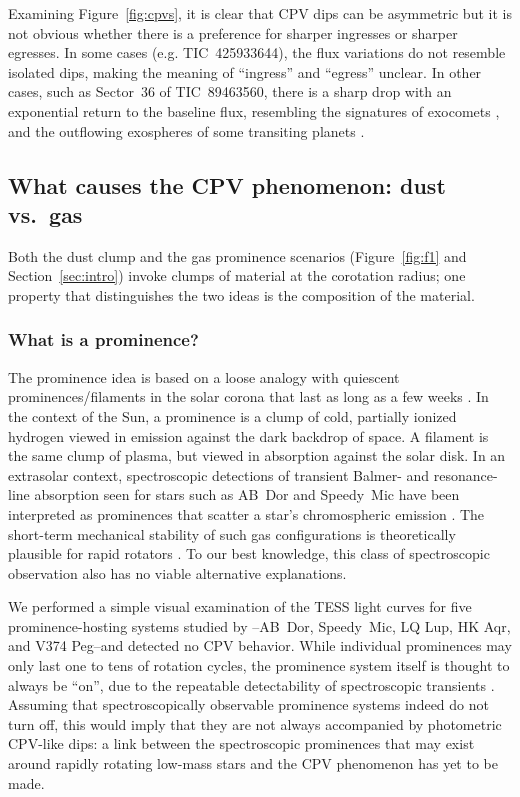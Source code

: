 \documentclass[11pt,twocolumn,tighten,linenumbers]{aastex63}
\begin{document}
Examining Figure~\ref{fig:cpvs}, it is clear that CPV dips can be
asymmetric but it is not obvious whether there is a preference for
sharper ingresses or sharper egresses.  In some cases (e.g.
TIC~425933644), the flux variations do not resemble isolated dips,
making the meaning of ``ingress'' and ``egress'' unclear.  In other
cases, such as Sector~36 of TIC~89463560, there is a sharp drop with
an exponential return to the baseline flux, resembling the signatures
of exocomets \citep[e.g.][]{2018MNRAS.474.1453R,2019A&A...625L..13Z},
and the outflowing exospheres of some transiting planets
\citep[e.g.][]{2019ApJ...873...89M,2022ApJ...926..226M}.


\subsection{What causes the CPV phenomenon: dust vs.\ gas}

Both the dust clump and the gas prominence scenarios
(Figure~\ref{fig:f1} and Section~\ref{sec:intro}) invoke clumps of
material at the corotation radius; one property that distinguishes the
two ideas is the composition of the material.

\subsubsection{What is a prominence?}
The prominence idea is based on a loose analogy with quiescent
prominences/filaments in the solar corona that last as long as a few
weeks \citep[see][]{2015ASSL..415.....V}.  In the context of the Sun,
a prominence is a clump of cold, partially ionized hydrogen viewed in
emission against the dark backdrop of space.  A filament is the same
clump of plasma, but viewed in absorption against the solar disk.  In
an extrasolar context, spectroscopic detections of transient Balmer-
and resonance-line absorption seen for stars such as AB~Dor and
Speedy~Mic
\citep[e.g.][]{1989MNRAS.238..657C,1993MNRAS.262..369J,2006MNRAS.365..530D,2016MNRAS.463..965L}
have been interpreted as prominences that scatter a star's
chromospheric emission \citep[see][]{1989MNRAS.238..657C}.  The
short-term mechanical stability of such gas configurations is
theoretically plausible for rapid rotators
\citep{2000MNRAS.316..647F,2022MNRAS.514.5465W}.   To our best
knowledge, this class of spectroscopic observation also has no viable
alternative explanations.

We performed a simple visual examination of the TESS light curves for
five prominence-hosting systems studied by
\citet{2019MNRAS.482.2853J}--AB~Dor, Speedy~Mic, LQ Lup, HK Aqr, and
V374 Peg--and detected no CPV behavior.  While individual prominences
may only last one to tens of rotation cycles, the prominence system
itself is thought to always be ``on'', due to the repeatable
detectability of spectroscopic transients \citep[e.g.][and references
therein]{1990MNRAS.247..415C}.  Assuming that spectroscopically
observable prominence systems indeed do not turn off, this would imply
that they are not always accompanied by photometric CPV-like dips: a
link between the spectroscopic prominences that may exist around
rapidly rotating low-mass stars and the CPV phenomenon has yet to be
made.  
\end{document}
